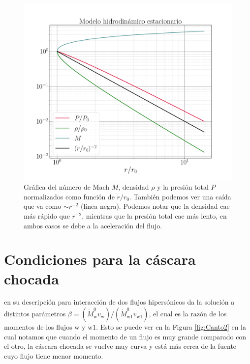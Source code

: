 \documentclass{book}
\begin{document}
\begin{figure}[htb]
    \centering    \includegraphics[width=\textwidth]{Nuevas imagenes finales/C2_estructura.pdf}
    \caption{Gráfica del número de Mach $M$, densidad $\rho$ y la presión total $P$ normalizados como función de $r/r_0$. También podemos ver una caída que va como $\sim r^{-2}$ (línea negra). Podemos notar que la densidad cae más rápido que $r^{-2}$, mientras que la presión total cae más lento, en ambos casos se debe a la aceleración del flujo.
    }
    \label{fig:grafica_C2}
\end{figure}

\section{Condiciones para la cáscara chocada}

\cite{Canto:1996} en su descripción para interacción de dos flujos hipersónicos da la solución a distintos parámetros $\beta=(\dot{M}^0_\mathrm{w} v_\mathrm{w})/(\dot{M}^0_\mathrm{w1}v_\mathrm{w1})$, el cual es la razón de los momentos de los flujos $\mathrm{w}$ y $\mathrm{w1}$. Esto se puede ver en la Figura \ref{fig:Canto2} en la cual notamos que cuando el momento de un flujo es muy  grande comparado con el otro, la cáscara chocada se vuelve muy curva y está más cerca de la fuente cuyo flujo tiene menor momento.
\end{document}
